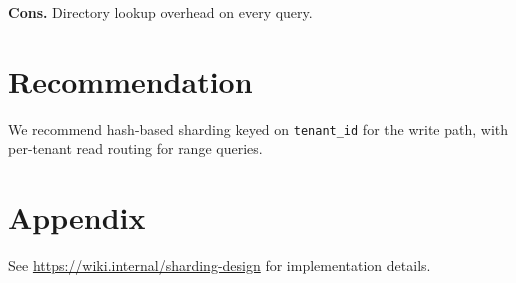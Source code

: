 \documentclass{report}
\begin{document}
\textbf{Cons.} Directory lookup overhead on every query.

\chapter{Recommendation}
We recommend hash-based sharding keyed on \texttt{tenant\_id} for the write path, with per-tenant read routing for range queries.

\chapter{Appendix}
See \url{https://wiki.internal/sharding-design} for implementation details.
\end{document}

